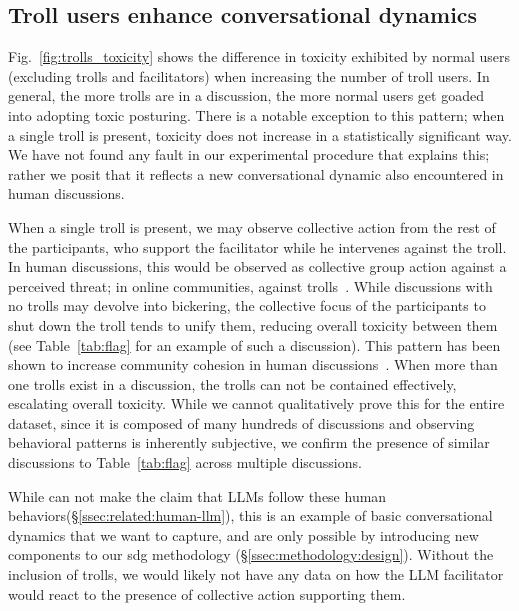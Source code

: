 \subsection{Troll users enhance conversational dynamics}



Fig.~\ref{fig:trolls_toxicity} shows the difference in toxicity exhibited by normal users (excluding trolls and facilitators) when increasing the number of troll users. In general, the more trolls are in a discussion, the more normal users get goaded into adopting toxic posturing. There is a notable exception to this pattern; when a single troll is present, toxicity does not increase in a statistically significant way. We have not found any fault in our experimental procedure that explains this; rather we posit that it reflects a new conversational dynamic also encountered in human discussions.

When a single troll is present, we may observe collective action from the rest of the participants, who support the facilitator while he intervenes against the troll. In human discussions, this would be observed as collective group action against a perceived threat; in online communities, against trolls~\cite{sun2021would,jakubowicz2017cyber,coles2016trolling}. While discussions with no trolls may devolve into bickering, the collective focus of the participants to shut down the troll tends to unify them, reducing overall toxicity between them (see Table~\ref{tab:flag} for an example of such a discussion). This pattern has been shown to increase community cohesion in human discussions~\cite{hopkinson2013trolling}. When more than one trolls exist in a discussion, the trolls can not be contained effectively, escalating overall toxicity. While we cannot qualitatively prove this for the entire dataset, since it is composed of many hundreds of discussions and observing behavioral patterns is inherently subjective, we confirm the presence of similar discussions to Table~\ref{tab:flag} across multiple discussions.

While can not make the claim that LLMs follow these human behaviors(\S\ref{ssec:related:human-llm}), this is an example of basic conversational dynamics that we want to capture, and are only possible by introducing new components to our \ac{sdg} methodology (\S\ref{ssec:methodology:design}).  Without the inclusion of trolls, we would likely not have any data on how the LLM facilitator would react to the presence of collective action supporting them.

